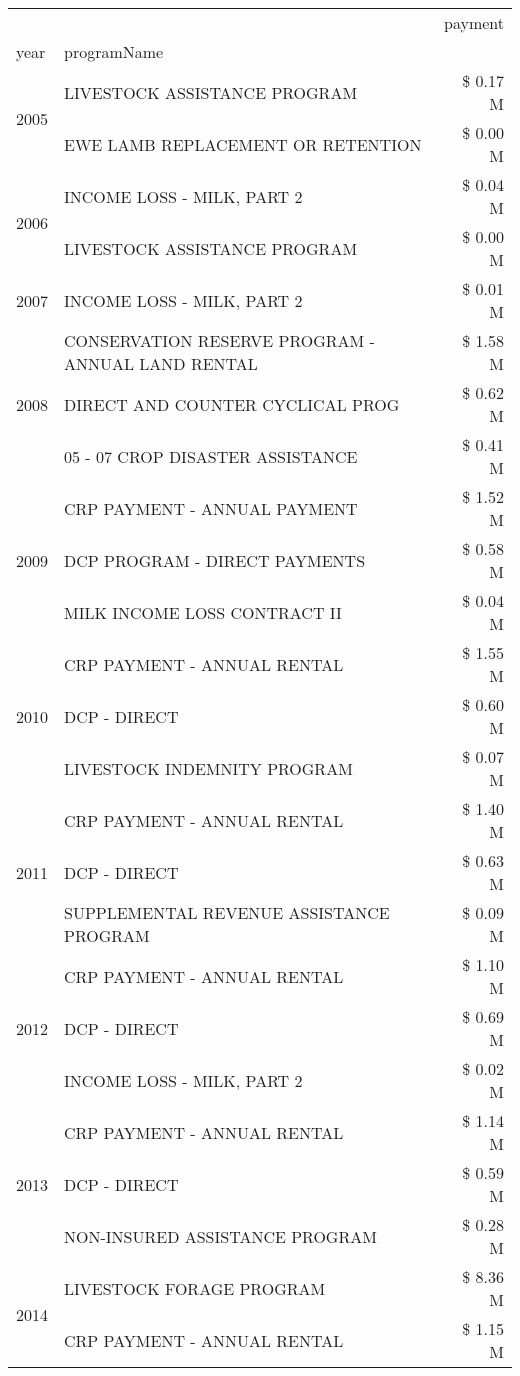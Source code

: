 \begin{tabular}{llr}
\toprule
 &  & payment \\
year & programName &  \\
\midrule
\multirow[t]{2}{*}{2005} & LIVESTOCK ASSISTANCE PROGRAM & \$ 0.17 M \\
 & EWE LAMB REPLACEMENT OR RETENTION & \$ 0.00 M \\
\cline{1-3}
\multirow[t]{2}{*}{2006} & INCOME LOSS - MILK, PART 2 & \$ 0.04 M \\
 & LIVESTOCK ASSISTANCE PROGRAM & \$ 0.00 M \\
\cline{1-3}
2007 & INCOME LOSS - MILK, PART 2 & \$ 0.01 M \\
\cline{1-3}
\multirow[t]{3}{*}{2008} & CONSERVATION RESERVE PROGRAM - ANNUAL LAND RENTAL & \$ 1.58 M \\
 & DIRECT AND COUNTER CYCLICAL PROG & \$ 0.62 M \\
 & 05 - 07 CROP DISASTER ASSISTANCE & \$ 0.41 M \\
\cline{1-3}
\multirow[t]{3}{*}{2009} & CRP PAYMENT - ANNUAL PAYMENT & \$ 1.52 M \\
 & DCP PROGRAM - DIRECT PAYMENTS & \$ 0.58 M \\
 & MILK INCOME LOSS CONTRACT II & \$ 0.04 M \\
\cline{1-3}
\multirow[t]{3}{*}{2010} & CRP PAYMENT - ANNUAL RENTAL & \$ 1.55 M \\
 & DCP - DIRECT & \$ 0.60 M \\
 & LIVESTOCK INDEMNITY PROGRAM & \$ 0.07 M \\
\cline{1-3}
\multirow[t]{3}{*}{2011} & CRP PAYMENT - ANNUAL RENTAL & \$ 1.40 M \\
 & DCP - DIRECT & \$ 0.63 M \\
 & SUPPLEMENTAL REVENUE ASSISTANCE PROGRAM & \$ 0.09 M \\
\cline{1-3}
\multirow[t]{3}{*}{2012} & CRP PAYMENT - ANNUAL RENTAL & \$ 1.10 M \\
 & DCP - DIRECT & \$ 0.69 M \\
 & INCOME LOSS - MILK, PART 2 & \$ 0.02 M \\
\cline{1-3}
\multirow[t]{3}{*}{2013} & CRP PAYMENT - ANNUAL RENTAL & \$ 1.14 M \\
 & DCP - DIRECT & \$ 0.59 M \\
 & NON-INSURED ASSISTANCE PROGRAM & \$ 0.28 M \\
\cline{1-3}
\multirow[t]{3}{*}{2014} & LIVESTOCK FORAGE PROGRAM & \$ 8.36 M \\
 & CRP PAYMENT - ANNUAL RENTAL & \$ 1.15 M \\

\end{tabular}
